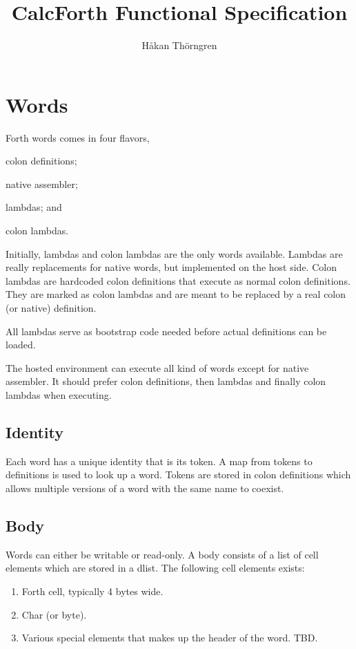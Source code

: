 \documentclass[a4paper]{article}
\begin{document}
\title{CalcForth Functional Specification}
\author{Håkan Thörngren}

 \maketitle


\section{Words}
Forth words comes in four flavors,
\begin{inparaenum}[\itshape 1\upshape)]
\item colon definitions;
\item native assembler;
\item lambdas; and
\item colon lambdas.
\end{inparaenum}

Initially, lambdas and colon lambdas are the only words available. Lambdas are really replacements for native words, but implemented on the host side. Colon lambdas are hardcoded colon definitions that execute as normal colon definitions. They are marked as colon lambdas and are meant to be replaced by a real colon (or native) definition.

All lambdas serve as bootstrap code needed before actual definitions can be loaded.

The hosted environment can execute all kind of words except for native assembler. It should prefer colon definitions, then lambdas and finally colon lambdas when executing.

\subsection{Identity}
Each word has a unique identity that is its token. A map from tokens to definitions is used to look up a word. Tokens are stored in colon definitions which allows multiple versions of a word with the same name to coexist.

\subsection{Body}
Words can either be writable or read-only. A body consists of a list of cell elements which are stored in a dlist.
The following cell elements exists:
\begin{enumerate}
\item Forth cell, typically 4 bytes wide.
\item Char (or byte).
\item Various special elements that makes up the header of the word. TBD.
\end{enumerate}
\end{document}

